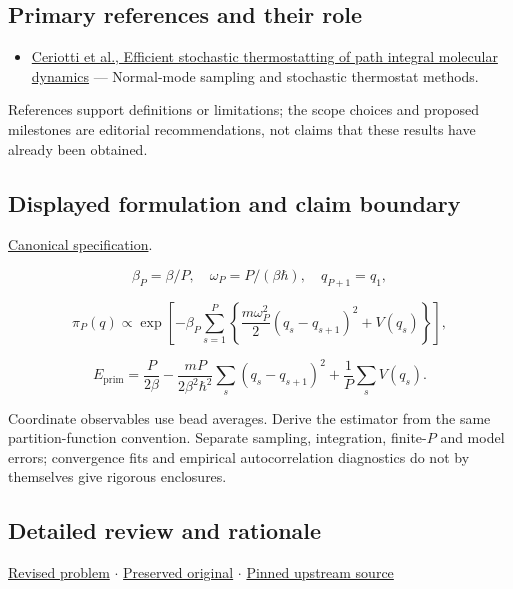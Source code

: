 \documentclass[
  11pt,
]{article}
\providecommand{\tightlist}{%
  \setlength{\itemsep}{0pt}\setlength{\parskip}{0pt}}
\begin{document}
\subsection{Primary references and their role}

\begin{itemize}
\tightlist
\item
  \href{https://arxiv.org/abs/1009.1045}{Ceriotti et al., Efficient
  stochastic thermostatting of path integral molecular dynamics} ---
  Normal-mode sampling and stochastic thermostat methods.
\end{itemize}

References support definitions or limitations; the scope choices and
proposed milestones are editorial recommendations, not claims that these
results have already been obtained.

\subsection{Displayed formulation and claim boundary}

\href{https://github.com/rick-stevens-ai/Pure-Thought/blob/main/PRDs/20-Ab-Initio-Path-Integrals.md}{Canonical
specification}.

\[\beta_P=\beta/P,\quad\omega_P=P/(\beta\hbar),\quad q_{P+1}=q_1,\]

\[\pi_P(q)\propto\exp\!\left[-\beta_P\sum_{s=1}^P
\left\{\frac{m\omega_P^2}{2}(q_s-q_{s+1})^2+V(q_s)\right\}\right],\]

\[E_{\mathrm{prim}}=\frac{P}{2\beta}
-\frac{mP}{2\beta^2\hbar^2}\sum_s(q_s-q_{s+1})^2
+\frac1P\sum_sV(q_s).\]

Coordinate observables use bead averages. Derive the estimator from the
same partition-function convention. Separate sampling, integration,
finite-\(P\) and model errors; convergence fits and empirical
autocorrelation diagnostics do not by themselves give rigorous
enclosures.

\subsection{Detailed review and rationale}

\href{https://github.com/rick-stevens-ai/Pure-Thought/blob/main/PRDs/20-Ab-Initio-Path-Integrals.md}{Revised
problem} \ensuremath{\cdot}
\href{https://github.com/rick-stevens-ai/Pure-Thought/blob/main/archive/original-PRDs/20-Ab-Initio-Path-Integrals.md}{Preserved
original} \ensuremath{\cdot}
\href{https://github.com/rick-stevens-ai/Pure-Thought/blob/f854d4e12b55c1f5b5c2a964b75f2d23496d981e/PRDs/20-Ab-Initio-Path-Integrals.md}{Pinned
upstream source}
\end{document}
